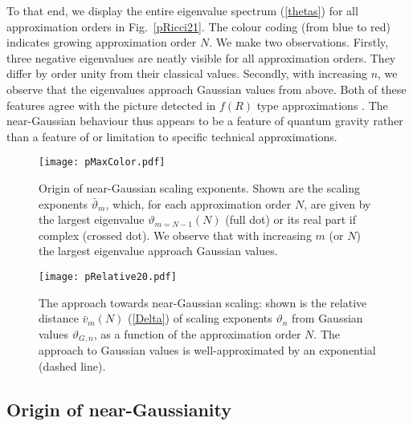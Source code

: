 \documentclass[notitlepage,eqsecnum,bm,amsmath,preprintnumbers,superscriptaddress,nofootinbib,aps,11pt]{revtex4-1}
\def\eq#1{(\ref{#1})}
\begin{document}
To that end, 
we display the entire eigenvalue spectrum \eq{thetas} for all approximation orders in Fig.~\ref{pRicci21}. The colour coding (from blue to red) indicates growing approximation order $N$. We make two observations. Firstly, three negative eigenvalues are neatly visible for all approximation orders. They differ by order unity from their classical values. Secondly, with increasing $n$, we observe that the eigenvalues approach Gaussian values from above. Both of these features agree with the picture detected in $f(R)$ type approximations \cite{Falls:2013bv,Falls:2014tra}. The near-Gaussian behaviour thus appears to be a feature of quantum gravity rather than a feature of or limitation to specific technical approximations.





\begin{figure}[t]
\centering
\begin{center}
\texttt{[image: pMaxColor.pdf]}
\caption{\label{pMaxColor} Origin of near-Gaussian scaling exponents. Shown are the scaling exponents $\bar\vartheta_m$, which, for each approximation order $N$, are given by the largest eigenvalue $\vartheta_{m=N-1}(N)$ (full dot) or its real part if complex (crossed dot). We observe that with increasing $m$ (or $N$) the largest eigenvalue approach Gaussian values.}
\end{center}
\end{figure}


\begin{figure}[t]
\centering
\begin{center}
\texttt{[image: pRelative20.pdf]}
\caption{\label{pRelative20} The approach towards near-Gaussian scaling: shown is the relative distance $\bar v_m(N)$  \eq{Delta} of  scaling exponents $\vartheta_n$ from Gaussian values $\vartheta_{G,n}$, as a function of the approximation order $N$. The approach to Gaussian values is well-approximated by an exponential (dashed line).}
\end{center}
\end{figure}

 

 \subsection{Origin of near-Gaussianity}
\end{document}
